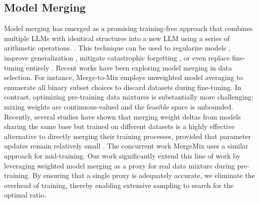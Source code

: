 \subsection{Model Merging} 
Model merging has emerged as a promising training-free approach that combines multiple LLMs with identical structures into a new LLM using a series of arithmetic operations. \cite{goddard2024arcee, wortsman2022model, ilharco2022editing, yadav2023ties, davari2024model}. This technique can be used to regularize models \cite{luo2025learning, wortsman2022robust}, improve generalization \cite{izmailov2018averaging, yang2024model}, mitigate catastrophic forgetting \cite{xiao2024lm}, or even replace fine-tuning entirely \cite{ahmadian2024mix}. 
Recent works have been exploring model merging in data selection. For instance, Merge-to-Mix \cite{tao2025merge} employs unweighted model averaging to enumerate all binary subset choices to discard datasets during fine-tuning. In contrast, optimizing pre-training data mixtures is substantially more challenging: mixing weights are continuous-valued and the feasible space is unbounded.
Recently, several studies have shown that merging weight deltas from models sharing the same base but trained on different datasets is a highly effective alternative to directly merging their training processes, provided that parameter updates remain relatively small \cite{wu2025shadow, lin2025efficient}. 
The concurrent work MergeMix \cite{wang2026mergemix} uses a similar approach for mid-training.
Our work significantly extend this line of work by leveraging weighted model merging as a proxy for real data mixture during pre-training. By ensuring that a single proxy is adequately accurate, we eliminate the overhead of training, thereby enabling extensive sampling to search for the optimal ratio. 